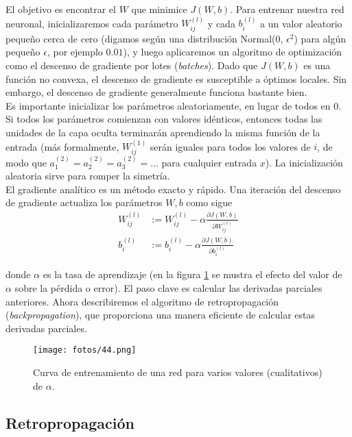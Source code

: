 El objetivo es encontrar el $W$ que minimice $J(W,b)$. Para entrenar nuestra red neuronal, inicializaremos cada parámetro $W^{(l)}_{ij}$ y cada $b^{(l)}_i$ a un valor aleatorio pequeño cerca de cero (digamos según una distribución Normal(0, $\epsilon^2$) para algún pequeño $\epsilon$, por ejemplo $0.01$), y luego aplicaremos un algoritmo de optimización como el descenso de gradiente por lotes (\textit{batches}). Dado que $J(W,b)$ es una función no convexa, el descenso de gradiente es susceptible a óptimos locales. Sin embargo, el descenso de gradiente generalmente funciona bastante bien. \\

Es importante inicializar los parámetros aleatoriamente, en lugar de todos en 0. Si todos los parámetros comienzan con valores idénticos, entonces todas las unidades de la capa oculta terminarán aprendiendo la misma función de la entrada (más formalmente, $W^{(1)}_{ij}$ serán iguales para todos los valores de $i$, de modo que $a^{(2)}_1 = a^{(2)}_2 = a^{(2)}_3 = \dots$ para cualquier entrada $x$). La inicialización aleatoria sirve para romper la simetría. \\

\noindent El gradiente analítico es un método exacto y rápido. Una iteración del descenso de gradiente actualiza los parámetros $W,b$ como sigue
\begin{align}
W^{(l)}_{ij} &:= W^{(l)}_{ij} - \alpha \frac{\partial J (W, b)}{\partial W^{(l)}_{ij}} \\
b^{(l)}_i &:= b^{(l)}_i - \alpha \frac{\partial J (W, b)}{\partial b^{(l)}_i}
\end{align}

donde $\alpha$ es la tasa de aprendizaje (en la figura \ref{fig:7.5} se mustra el efecto del valor de $\alpha$ sobre la pérdida o error). El paso clave es calcular las derivadas parciales anteriores. Ahora describiremos el algoritmo de retropropagación (\textit{backpropagation}), que proporciona una manera eficiente de calcular estas derivadas parciales. \\

\begin{figure}[h]
\centering
\texttt{[image: fotos/44.png]}
\caption{Curva de entrenamiento de una red para varios valores (cualitativos) de $\alpha$.}
\label{fig:7.5}
\end{figure}

\subsection{Retropropagación}

